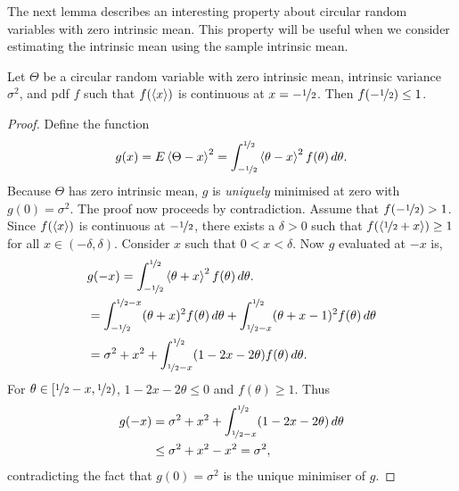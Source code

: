 \documentclass[journal]{../bib/IEEEtran}
\begin{document}

The next lemma describes an interesting property about circular random variables with zero intrinsic mean.  This property will be useful when we consider estimating the intrinsic mean using the sample intrinsic mean. 

\begin{lemma}\label{lem:antipolalzerounwpmean}
Let $\Theta$ be a circular random variable with zero intrinsic mean, intrinsic variance $\sigma^2$, and pdf $f$ such that $f(\left< x \right>)$ is continuous at $x = -\nicefrac{1}{2}$.  Then $f(-\nicefrac{1}{2}) \leq 1$.
\end{lemma}
\begin{proof}
Define the function
\[
g(x) = E\left< \Theta - x \right>^2 = \int_{-\nicefrac{1}{2}}^{\nicefrac{1}{2}}\left< \theta - x \right>^2f(\theta) \, d\theta.
\]
Because $\Theta$ has zero intrinsic mean, $g$ is \emph{uniquely} minimised at zero with $g(0) = \sigma^2$.  The proof now proceeds by contradiction. Assume that $f(-\nicefrac{1}{2}) > 1$.  Since $f(\left< x \right>)$ is continuous at $-\nicefrac{1}{2}$, there exists a $\delta > 0$ such that $f(\left< \nicefrac{1}{2} + x \right>) \geq 1$ for all $x \in (-\delta, \delta)$.  Consider $x$ such that $0 < x < \delta$.  Now $g$ evaluated at $-x$ is,
\begin{align*}
&g(-x) = \int_{-\nicefrac{1}{2}}^{\nicefrac{1}{2}}\left< \theta + x \right>^2 f(\theta) \, d\theta. \\
&= \int_{-\nicefrac{1}{2}}^{\nicefrac{1}{2} - x}(\theta + x)^2 f(\theta) \, d\theta + \int_{\nicefrac{1}{2} - x}^{\nicefrac{1}{2}}(\theta + x - 1)^2 f(\theta) \, d\theta \\
&= \sigma^2 + x^2 + \int_{\nicefrac{1}{2} - x}^{\nicefrac{1}{2}}(1 - 2x - 2\theta)f(\theta) \, d\theta.
\end{align*}
For $\theta \in [\nicefrac{1}{2} - x, \nicefrac{1}{2})$, $1 - 2x - 2\theta \leq 0$ and $f(\theta) \geq 1$. Thus
\begin{align*}
g(-x) &= \sigma^2 + x^2 + \int_{\nicefrac{1}{2} - x}^{\nicefrac{1}{2}}(1 - 2x - 2\theta) \, d\theta \\
&\leq \sigma^2 + x^2 - x^2 = \sigma^2,
\end{align*}
contradicting the fact that $g(0) = \sigma^2$ is the unique minimiser of $g$.
\end{proof}
\end{document}
